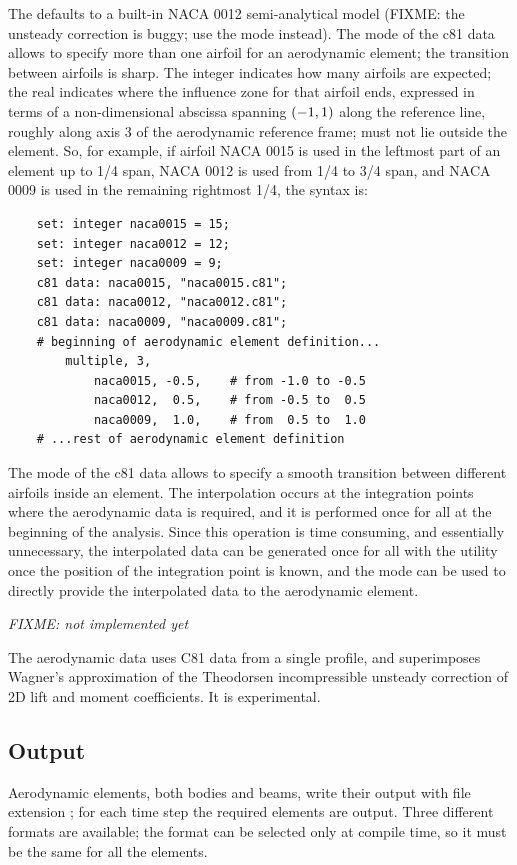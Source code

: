 The  defaults to a built-in NACA 0012 semi-analytical
model (FIXME: the unsteady correction is buggy; use the  
mode instead).
The  mode of the c81 data allows to specify
more than one airfoil for an aerodynamic element; the transition
between airfoils is sharp.
The integer  indicates how many airfoils are expected;
the real  indicates where the influence zone for that
airfoil ends, expressed in terms of a non-dimensional abscissa spanning 
$\left( -1,1 \right)$ along the reference line, roughly along axis 3 
of the aerodynamic reference frame;  must not lie outside
the element.
So, for example, if airfoil NACA 0015 is used in the leftmost part
of an element up to 1/4 span, NACA 0012 is used from 1/4 to 3/4 span,
and NACA 0009 is used in the remaining rightmost 1/4, the syntax is:
\begin{verbatim}
    set: integer naca0015 = 15;
    set: integer naca0012 = 12;
    set: integer naca0009 = 9;
    c81 data: naca0015, "naca0015.c81";
    c81 data: naca0012, "naca0012.c81";
    c81 data: naca0009, "naca0009.c81";
    # beginning of aerodynamic element definition...
        multiple, 3,
            naca0015, -0.5,    # from -1.0 to -0.5
            naca0012,  0.5,    # from -0.5 to  0.5
            naca0009,  1.0,    # from  0.5 to  1.0
    # ...rest of aerodynamic element definition
\end{verbatim}
The  mode of the c81 data allows to specify 
a smooth transition between different airfoils inside an element.
The interpolation occurs at the integration points where the
aerodynamic data is required, and it is performed once for all
at the beginning of the analysis.
Since this operation is time consuming, and essentially unnecessary,
the interpolated data can be generated once for all with the utility
 once the position of the integration point is known,
and the  mode can be used to directly provide
the interpolated data to the aerodynamic element.

\noindent
\emph{FIXME: not implemented yet}

The  aerodynamic data uses C81 data from a single profile,
and superimposes Wagner's approximation of the Theodorsen incompressible
unsteady correction of 2D lift and moment coefficients.
It is experimental.


\subsection{Output}
Aerodynamic elements, both bodies and beams, write their output with file
extension ; for each time step the required elements are output.
Three different formats are available; the format can be selected only at
compile time, so it must be the same for all the elements. 

